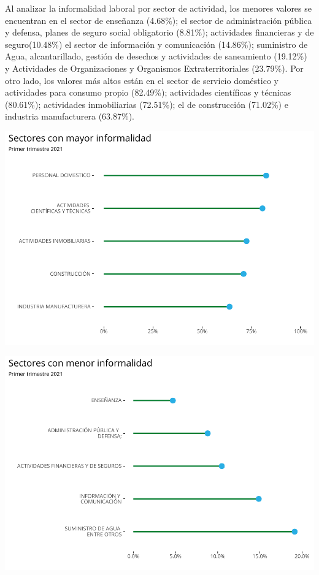 \documentclass[
]{article}
\begin{document}
Al analizar la informalidad laboral por sector de actividad, los menores
valores se encuentran en el sector de enseñanza (4.68\%); el sector de
administración pública y defensa, planes de seguro social obligatorio
(8.81\%); actividades financieras y de seguro(10.48\%) el sector de
información y comunicación (14.86\%); suministro de Agua,
alcantarillado, gestión de desechos y actividades de saneamiento
(19.12\%) y Actividades de Organizaciones y Organismos
Extraterritoriales (23.79\%). Por otro lado, los valores más altos están
en el sector de servicio doméstico y actividades para consumo propio
(82.49\%); actividades científicas y técnicas (80.61\%); actividades
inmobiliarias (72.51\%); el de construcción (71.02\%) e industria
manufacturera (63.87\%).

\includegraphics{Informe-Mercado-Laboral_files/figure-latex/unnamed-chunk-39-1.pdf}

\includegraphics{Informe-Mercado-Laboral_files/figure-latex/unnamed-chunk-40-1.pdf}
\end{document}
